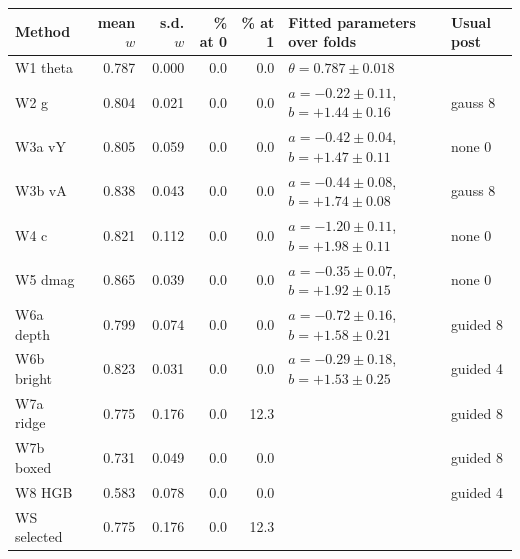 \begin{tabular}{lrrrrll}
\toprule
Method & mean $w$ & s.d. $w$ & \% at 0 & \% at 1 & Fitted parameters over folds & Usual post \\
\midrule
W1 theta & 0.787 & 0.000 & 0.0 & 0.0 & $\theta=0.787\pm0.018$ &  \\
W2 g & 0.804 & 0.021 & 0.0 & 0.0 & $a=-0.22\pm0.11$, $b=+1.44\pm0.16$ & gauss 8 \\
W3a vY & 0.805 & 0.059 & 0.0 & 0.0 & $a=-0.42\pm0.04$, $b=+1.47\pm0.11$ & none 0 \\
W3b vA & 0.838 & 0.043 & 0.0 & 0.0 & $a=-0.44\pm0.08$, $b=+1.74\pm0.08$ & gauss 8 \\
W4 c & 0.821 & 0.112 & 0.0 & 0.0 & $a=-1.20\pm0.11$, $b=+1.98\pm0.11$ & none 0 \\
W5 dmag & 0.865 & 0.039 & 0.0 & 0.0 & $a=-0.35\pm0.07$, $b=+1.92\pm0.15$ & none 0 \\
W6a depth & 0.799 & 0.074 & 0.0 & 0.0 & $a=-0.72\pm0.16$, $b=+1.58\pm0.21$ & guided 8 \\
W6b bright & 0.823 & 0.031 & 0.0 & 0.0 & $a=-0.29\pm0.18$, $b=+1.53\pm0.25$ & guided 4 \\
W7a ridge & 0.775 & 0.176 & 0.0 & 12.3 &  & guided 8 \\
W7b boxed & 0.731 & 0.049 & 0.0 & 0.0 &  & guided 8 \\
W8 HGB & 0.583 & 0.078 & 0.0 & 0.0 &  & guided 4 \\
WS selected & 0.775 & 0.176 & 0.0 & 12.3 &  &  \\
\bottomrule
\end{tabular}
